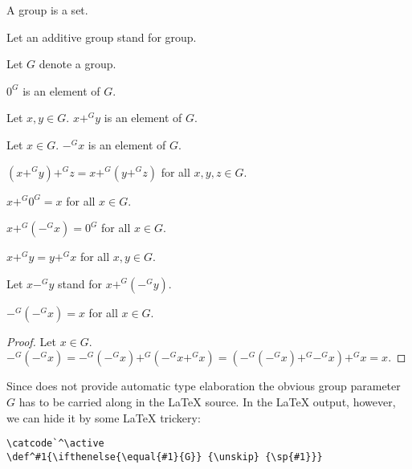 \documentclass[english,11pt]{article}
\begin{document}
\begin{forthel}
\begin{signature} A group is a set. \end{signature}

Let an additive group stand for group.

Let $G$ denote a group.

\begin{signature} $0^{G}$ is an element of $G$.
\end{signature}

\begin{signature} Let $x,y \in G$. $x +^{G} y$ is an element of $G$. \end{signature}

\begin{signature} Let $x \in G$. $-^{G} x$ is an element of $G$. \end{signature}

\begin{axiom}[id = Associativity, title = Associativity] $(x +^{G} y) +^{G} z = x +^{G} (y +^{G} z)$ for all $x,y,z \in G$.
\end{axiom} 
\begin{axiom} $x +^{G} 0^{G} = x$ for all $x \in G$.
\end{axiom}
\begin{axiom} $x +^{G} (-^{G} x) = 0^{G}$ for all $x \in G$.
\end{axiom}
\begin{axiom} $x +^{G} y = y +^{G} x$ for all $x,y \in G$.
\end{axiom}

Let $x -^{G} y$ stand for $x +^{G} (-^{G} y)$.

\begin{lemma}
$ -^{G} (-^{G} x) = x$ for all $x \in G$.
\end{lemma}
\begin{proof}
Let $x \in G$.
$ -^{G} (-^{G} x) =  -^{G} (-^{G} x) +^{G} (-^{G} x +^{G} x)
=  (-^{G} (-^{G} x) +^{G} -^{G} x) +^{G} x = x$.
\end{proof}
\end{forthel}
Since \Naproche does not provide automatic type elaboration the obvious 
group parameter $G$ has to be carried along in the \LaTeX{} source.
In the \LaTeX{} output, however, we can hide it by 
some \LaTeX{} trickery:
\begin{verbatim}
\catcode`^\active
\def^#1{\ifthenelse{\equal{#1}{G}} {\unskip} {\sp{#1}}}
\end{verbatim}
\end{document}
